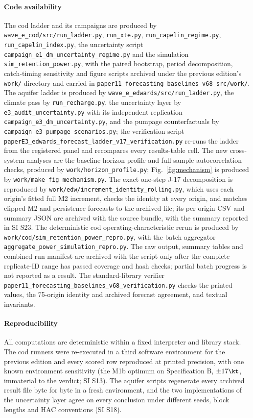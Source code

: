 \paragraph{Code availability} The cod ladder and its campaigns are produced by \texttt{wave\_e\_cod/src/run\_ladder.py}, \texttt{run\_xte.py}, \texttt{run\_capelin\_regime.py}, \texttt{run\_capelin\_index.py}, the uncertainty script \texttt{campaign\_e1\_dm\_uncertainty\_regime.py} and the simulation \texttt{sim\_retention\_power.py}, with the paired bootstrap, period decomposition, catch-timing sensitivity and figure scripts archived under the previous edition's \texttt{work/} directory and carried in \texttt{paper11\_forecasting\_baselines\_v68\_src/work/}. The aquifer ladder is produced by \texttt{wave\_e\_edwards/src/run\_ladder.py}, the climate pass by \texttt{run\_recharge.py}, the uncertainty layer by \texttt{e3\_audit\_uncertainty.py} with its independent replication \texttt{campaign\_e3\_dm\_uncertainty.py}, and the pumpage counterfactuals by \texttt{campaign\_e3\_pumpage\_scenarios.py}; the verification script \texttt{paperE3\_edwards\_forecast\_ladder\_v17\_verification.py} re-runs the ladder from the registered panel and recompares every results-table cell. The new cross-system analyses are the baseline horizon profile and full-sample autocorrelation checks, produced by \texttt{work/horizon\_profile.py}; Fig.~\ref{fig:mechanism} is produced by \texttt{work/make\_fig\_mechanism.py}. The exact one-step J-17 decomposition is reproduced by \texttt{work/edw/increment\_identity\_rolling.py}, which uses each origin's fitted full M2 increment, checks the identity at every origin, and matches clipped M2 and persistence forecasts to the archived file; its per-origin CSV and summary JSON are archived with the source bundle, with the summary reported in SI S23. The deterministic cod operating-characteristic rerun is produced by \texttt{work/cod/sim\_retention\_power\_repro.py}, with the batch aggregator \texttt{aggregate\_power\_simulation\_repro.py}. The raw output, summary tables and combined run manifest are archived with the script only after the complete replicate-ID range has passed coverage and hash checks; partial batch progress is not reported as a result. The standard-library verifier \texttt{paper11\_forecasting\_baselines\_v68\_verification.py} checks the printed values, the 75-origin identity and archived forecast agreement, and textual invariants.

\paragraph{Reproducibility} All computations are deterministic within a fixed interpreter and library stack. The cod runners were re-executed in a third software environment for the previous edition and every scored row reproduced at printed precision, with one known environment sensitivity (the M1b optimum on Specification B, $\pm17\kt$, immaterial to the verdict; SI S13). The aquifer scripts regenerate every archived result file byte for byte in a fresh environment, and the two implementations of the uncertainty layer agree on every conclusion under different seeds, block lengths and HAC conventions (SI S18).

